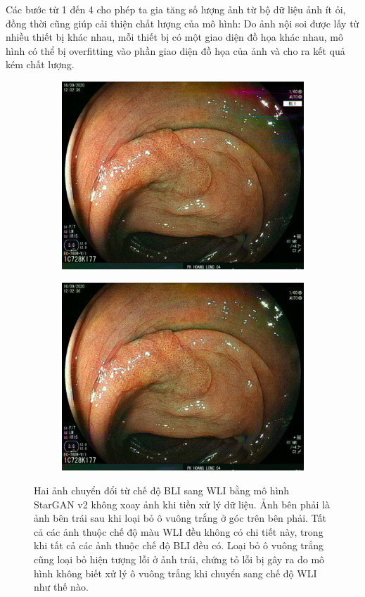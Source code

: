 \documentclass[12pt]{extreport}
\begin{document}
Các bước từ 1 đến 4 cho phép ta gia tăng số lượng ảnh từ bộ dữ liệu ảnh ít ỏi, đồng thời cũng giúp cải thiện chất lượng của mô hình: Do ảnh nội soi được lấy từ nhiều thiết bị khác nhau, mỗi thiết bị có một giao diện đồ họa khác nhau, mô hình có thể bị overfitting vào phần giao diện đồ họa của ảnh và cho ra kết quả kém chất lượng.

\begin{figure}[H]
    \centering
    \begin{subfigure}[H]{0.48\textwidth}
        \centering
        \includegraphics[width=\linewidth]{figure38.jpeg}
    \end{subfigure}
    \begin{subfigure}[H]{0.48\textwidth}
        \centering
        \includegraphics[width=\linewidth]{figure39.jpeg}
    \end{subfigure}
    \caption{Hai ảnh chuyển đổi từ chế độ BLI sang WLI bằng mô hình StarGAN v2 không xoay ảnh khi tiền xử lý dữ liệu. Ảnh bên phải là ảnh bên trái sau khi loại bỏ ô vuông trắng ở góc trên bên phải. Tất cả các ảnh thuộc chế độ màu WLI đều không có chi tiết này, trong khi tất cả các ảnh thuộc chế độ BLI đều có. Loại bỏ ô vuông trắng cũng loại bỏ hiện tượng lỗi ở ảnh trái, chứng tỏ lỗi bị gây ra do mô hình không biết xử lý ô vuông trắng khi chuyển sang chế độ WLI như thế nào.}
\end{figure}
\end{document}
